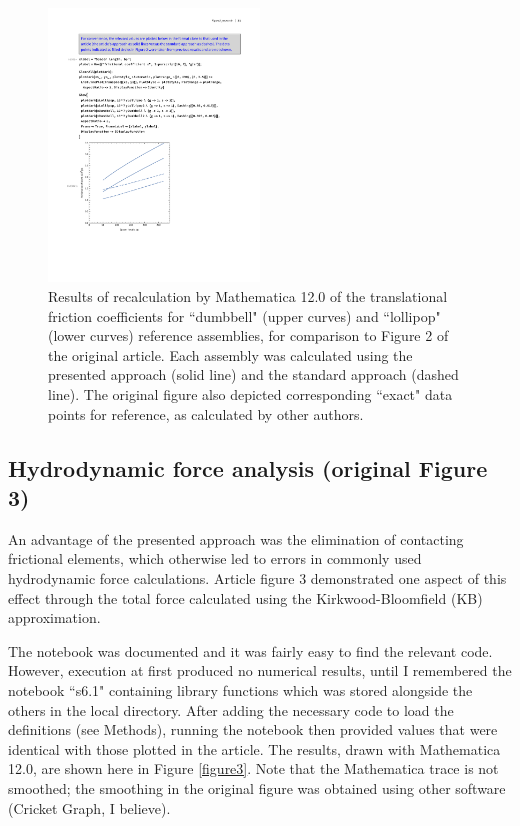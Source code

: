 \begin{figure}[H]
\centering
\includegraphics[width=0.5\textwidth]{figs/figure2M12.pdf}
\caption{Results of recalculation by Mathematica 12.0 of the translational friction coefficients for ``dumbbell" (upper curves) and ``lollipop" (lower curves) reference assemblies, for comparison to Figure 2 of the original article. Each assembly was calculated using the presented approach (solid line) and the standard approach (dashed line). The original figure also depicted corresponding ``exact" data points for reference, as calculated by other authors.}
\label{figure2}
\end{figure}


\subsection{Hydrodynamic force analysis (original Figure 3)}
An advantage of the presented approach was the elimination of contacting frictional elements, which otherwise led to errors in commonly used hydrodynamic force calculations. Article figure 3 demonstrated one aspect of this effect through the total force calculated using the Kirkwood-Bloomfield (KB) approximation.

The notebook was documented and it was fairly easy to find the relevant code. However, execution at first produced no numerical results, until I remembered the notebook ``s6.1" containing library functions which was stored alongside the others in the local directory. 
After adding the necessary code to load the definitions (see Methods), running the notebook then provided values that were identical with those plotted in the article. The results, drawn with Mathematica 12.0, are shown 
here in Figure \ref{figure3}.
Note that the Mathematica trace is not smoothed; the smoothing in the original figure was obtained using other software (Cricket Graph, I believe).


